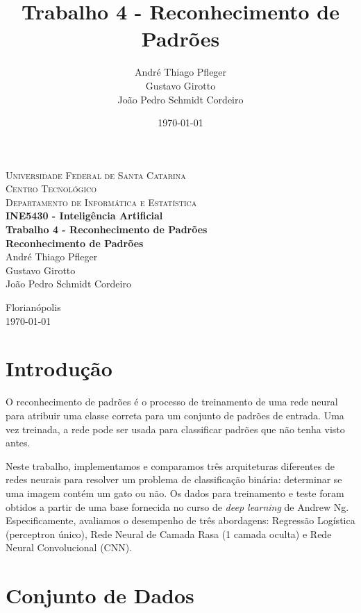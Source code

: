 \documentclass[a4paper,12pt]{article}
\title{Trabalho 4 - Reconhecimento de Padrões}
\author{André Thiago Pfleger \\  Gustavo Girotto \\ João Pedro Schmidt Cordeiro}
\date{\today}
\begin{document}
\begin{titlepage}
   \begin{center}
      \textsc{Universidade Federal de Santa Catarina} \\
      \textsc{Centro Tecnológico} \\
      \textsc{Departamento de Informática e Estatística} \\[4cm]

      \textbf{\Large{INE5430 - Inteligência Artificial}} \\[2cm]

      \textbf{\huge{Trabalho 4 - Reconhecimento de Padrões} \\[0.5cm]
      \Large{Reconhecimento de Padrões}} \\[3cm]

      André Thiago Pfleger \\
      Gustavo Girotto \\
      João Pedro Schmidt Cordeiro \\

      \vfill

      {Florianópolis} \\
      {\today}
   \end{center}
\end{titlepage}


\section{Introdução}
\label{sec:introducao}

O reconhecimento de padrões é o processo de treinamento de uma rede neural para atribuir uma classe correta para um conjunto de padrões de entrada. Uma vez treinada, a rede pode ser usada para classificar padrões que não tenha visto antes.

Neste trabalho, implementamos e comparamos três arquiteturas diferentes de redes neurais para resolver um problema de classificação binária: determinar se uma imagem contém um gato ou não. Os dados para treinamento e teste foram obtidos a partir de uma base fornecida no curso de \textit{deep learning} de Andrew Ng. Especificamente, avaliamos o desempenho de três abordagens: Regressão Logística (perceptron único), Rede Neural de Camada Rasa (1 camada oculta) e Rede Neural Convolucional (CNN).

\section{Conjunto de Dados}
\label{sec:dados}
\end{document}
